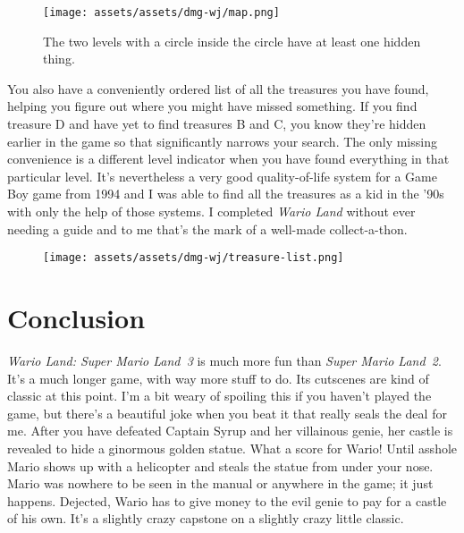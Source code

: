 \documentclass{book}
\begin{document}
\begin{figure}[hbt]
\vskip 10pt
\centering \texttt{[image: assets/assets/dmg-wj/map.png]}\par\pagetwodescription The two levels with a circle inside the circle have at least one hidden thing.
\vskip 6pt
\end{figure}

You also have a conveniently ordered list of all the treasures you have found, helping you figure out where you might have missed something. If you find treasure D and have yet to find treasures B and C, you know they’re hidden earlier in the game so that significantly narrows your search. The only missing convenience is a different level indicator when you have found everything in that particular level. It’s nevertheless a very good quality-of-life system for a Game Boy game from 1994 and I was able to find all the treasures as a kid in the ’90s with only the help of those systems. I completed \emph{Wario Land} without ever needing a guide and to me that’s the mark of a well-made collect-a-thon.

\begin{figure}[hbt]
\vskip 10pt
\centering \texttt{[image: assets/assets/dmg-wj/treasure-list.png]}
\vskip 6pt
\end{figure}

\FloatBarrier\needspace{10mm}\section*{Conclusion}\nopagebreak[4]

\emph{Wario Land: Super Mario Land 3} is much more fun than \emph{Super Mario Land 2}. It’s a much longer game, with way more stuff to do. Its cutscenes are kind of classic at this point. I’m a bit weary of spoiling this if you haven’t played the game, but there’s a beautiful joke when you beat it that really seals the deal for me. After you have defeated Captain Syrup and her villainous genie, her castle is revealed to hide a ginormous golden statue. What a score for Wario! Until asshole Mario shows up with a helicopter and steals the statue from under your nose. Mario was nowhere to be seen in the manual or anywhere in the game; it just happens. Dejected, Wario has to give money to the evil genie to pay for a castle of his own. It’s a slightly crazy capstone on a slightly crazy little classic.


\endgroup 
\end{document}
